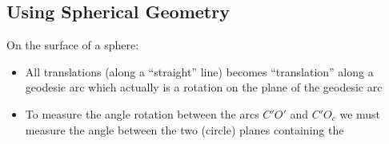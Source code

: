 \documentclass{article}
\begin{document}
\subsection*{Using Spherical Geometry}
On the surface of a sphere:
\begin{itemize}
    \item All translations (along a ``straight'' line) becomes ``translation'' along a geodesic arc which actually is a rotation on the plane of the geodesic arc
    \item To measure the angle rotation between the arcs $C'O'$ and $C'O_c$ we must measure the angle between the two (circle) planes containing the

\end{itemize}
\end{document}

